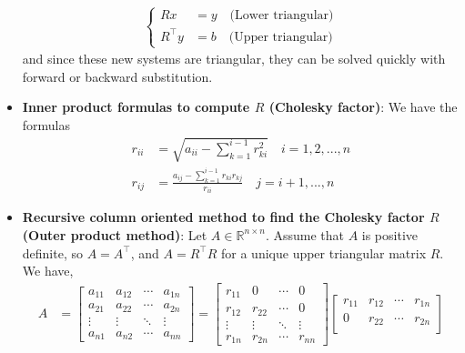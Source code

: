 \documentclass{report}
\begin{document}
\begin{itemize}
            \begin{align*}
                \begin{cases}
                        Rx &= y \quad \text{(Lower triangular)}              \\
                        R^{\top}y &= b \quad \text{(Upper triangular)}
                \end{cases}
            \end{align*}
            and since these new systems are triangular, they can be solved quickly with forward or backward substitution.
        \item \textbf{Inner product formulas to compute $R$ (Cholesky factor)}: We have the formulas
            \begin{align*}
                r_{ii} &= \sqrt{a_{ii} - \sum_{k=1}^{i-1}r_{ki}^{2}} \quad i = 1,2,...,n \\
                r_{ij} &= \frac{a_{ij} - \sum_{k=1}^{i-1}r_{ki}r_{kj}}{r_{ii}} \quad j = i+1,...,n
            \end{align*}
        \item \textbf{Recursive column oriented method to find the Cholesky factor $R$ (Outer product method)}: Let $A \in \mathbb{R}^{n\times n}$. Assume that $A$ is positive definite, so $A = A^{\top}$, and $A = R^{\top}R$ for a unique upper triangular matrix $R$. We have,
            \begin{align*}
                A &= \begin{bmatrix} a_{11} & a_{12} & \cdots & a_{1n} \\ a_{21} & a_{22} & \cdots & a_{2n} \\ \vdots & \vdots & \ddots & \vdots \\ a_{n1} & a_{n2} & \cdots & a_{nn} \end{bmatrix} = 
                \begin{bmatrix}
                    r_{11} & 0  & \cdots & 0\\
                    r_{12} & r_{22}  &  \cdots & 0 \\
                    \vdots & \vdots & \ddots & \vdots\\
                    r_{1n} & r_{2n} & \cdots & r_{nn}
                \end{bmatrix}
                \begin{bmatrix}
                    r_{11} & r_{12} & \cdots & r_{1n} \\
                    0 & r_{22} & \cdots & r_{2n} \\

\end{bmatrix}
\end{align*}
\end{itemize}
\end{document}
